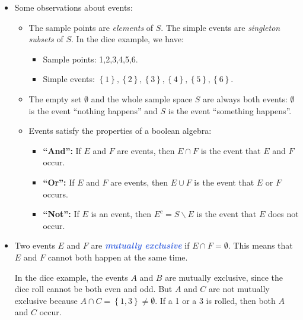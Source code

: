 \documentclass[10pt]{article}
\theoremstyle{definition}
\newcommand{\1}[1]{\textbf{1}_{\left[#1\right]}} %
\newcommand{\demph}[1]{\textcolor{RoyalBlue}{\textbf{\slshape #1}}} %
\begin{document}
\begin{itemize}
  \item Some observations about events:
  \begin{itemize}
    \item The sample points are \textit{elements} of $S$. The simple events are
    \textit{singleton subsets} of $S$. In the dice example, we have:
    \begin{itemize}
      \item Sample points: 1,2,3,4,5,6.
      \item Simple events: $\left\{1\right\},\left\{2\right\},\left\{3\right\},\left\{4\right\},\left\{5\right\},\left\{6\right\}$.
    \end{itemize}
    \item The empty set $\emptyset$ and the whole sample space $S$ are always
    both events: $\emptyset$ is the event ``nothing happens'' and $S$ is the
    event ``something happens''.
    \item Events satisfy the properties of a boolean algebra:
    \begin{itemize}
      \item \textbf{``And'':} If $E$ and $F$ are events, then $E\cap F$ is the
      event that $E$ and $F$ occur.
      \item \textbf{``Or'':} If $E$ and $F$ are events, then $E\cup F$ is the
      event that $E$ or $F$ occurs.
      \item \textbf{``Not'':} If $E$ is an event, then $E^{c}= S\backslash E$
      is the event that $E$ does not occur.
    \end{itemize}
  \end{itemize}
  \item Two events $E$ and $F$ are \demph{mutually exclusive} if
  $E\cap F =\emptyset$. This means that $E$ and $F$ cannot both happen at the
  same time.

  In the dice example, the events $A$ and $B$ are mutually exclusive, since
  the dice roll cannot be both even and odd. But $A$ and $C$ are not mutually
  exclusive because $A\cap C =\left\{1,3\right\}\neq \emptyset$. If a 1 or a 3
  is rolled, then both $A$ and $C$ occur.
  
\end{itemize}
\end{document}
